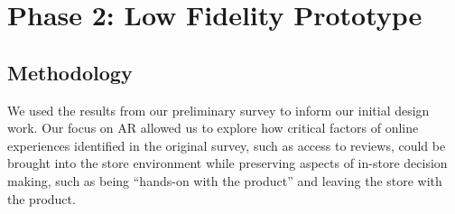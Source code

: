 \section{Phase 2: Low Fidelity Prototype}
\subsection{Methodology}
We used the results from our preliminary survey to inform our initial design work. Our focus on AR allowed us to explore how critical factors of online experiences identified in the original survey, such as access to reviews, could be brought into the store environment while preserving aspects of in-store decision making, such as being ``hands-on with the product'' and leaving the store with the product. 

